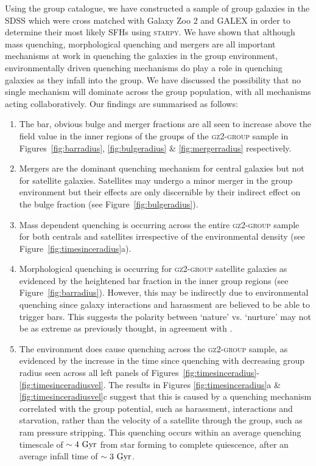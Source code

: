 \documentclass[useAMS,usenatbib]{mn2e}
\begin{document}
Using the \citet{berlind06} group catalogue, we have constructed a sample of group galaxies in the SDSS which were cross matched with Galaxy Zoo 2 and GALEX in order to determine their most likely SFHs using \textsc{starpy}. We have shown that although mass quenching, morphological quenching and mergers are all important mechanisms at work in quenching the galaxies in the group environment, environmentally driven quenching mechanisms do play a role in quenching galaxies as they infall into the group. We have discussed the possibility that no single mechanism will dominate across the group population, with all mechanisms acting collaboratively. Our findings are summarised as follows:
\begin{enumerate}
\item The bar, obvious bulge and merger fractions are all seen to increase above the field value in the inner regions of the groups of the \textsc{gz2-group} sample in Figures~\ref{fig:barradius}, \ref{fig:bulgeradius} \& \ref{fig:mergerradius} respectively.  
 
\item Mergers are the dominant quenching mechanism for central galaxies but not for satellite galaxies. Satellites may undergo a minor merger in the group environment but their effects are only discernible by their indirect effect on the bulge fraction (see Figure~\ref{fig:bulgeradius}).
 
\item Mass dependent quenching is occurring across the entire \textsc{gz2-group} sample for both centrals and satellites irrespective of the environmental density (see Figure~\ref{fig:timesinceradius}a).
 
\item Morphological quenching is occurring for \textsc{gz2-group} satellite galaxies as evidenced by the heightened bar fraction in the inner group regions (see Figure~\ref{fig:barradius}). However, this may be indirectly due to environmental quenching since galaxy interactions and harassment are believed to be able to trigger bars. This suggests the polarity between `nature' vs. `nurture' may not be as extreme as previously thought, in agreement with \cite{skibba12}. 

\item The environment does cause quenching across the \textsc{gz2-group} sample, as evidenced by the increase in the time since quenching with decreasing group radius seen across all left panels of Figures~\ref{fig:timesinceradius}-\ref{fig:timesinceradiusvel}. The results in Figures \ref{fig:timesinceradius}a \&  \ref{fig:timesinceradiusvel}c suggest that this is caused by a quenching mechanism correlated with the group potential, such as harassment, interactions and starvation, rather than the velocity of a satellite through the group, such as ram pressure stripping. This quenching occurs within an average quenching timescale of $\sim4~\rm{Gyr}$ from star forming to complete quiescence, after an average infall time of $\sim 3 ~\rm{Gyr}$. 
  
\end{enumerate}
\end{document}

